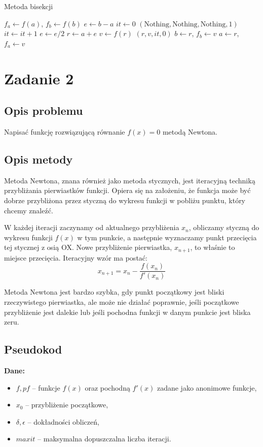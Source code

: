\documentclass{article}
\begin{document}
\begin{algorithm}[H]
\caption{Metoda bisekcji}
\begin{algorithmic}[1]
\STATE $f_a \gets f(a)$, $f_b \gets f(b)$
\STATE $e \gets b - a$
\STATE $it \gets 0$
    \RETURN $(\text{Nothing}, \text{Nothing}, \text{Nothing}, 1)$
\ENDIF
\WHILE{\TRUE}
    \STATE $it \gets it + 1$
    \STATE $e \gets e / 2$
    \STATE $r \gets a + e$
    \STATE $v \gets f(r)$
        \RETURN $(r, v, it, 0)$
    \ENDIF
        \STATE $b \gets r$, $f_b \gets v$
    \ELSE
        \STATE $a \gets r$, $f_a \gets v$
    \ENDIF
\ENDWHILE
\end{algorithmic}
\end{algorithm}

\section{Zadanie 2}
\subsection{Opis problemu}
Napisać funkcję rozwiązującą równanie \( f(x) = 0 \) metodą Newtona.

\subsection{Opis metody}
Metoda Newtona, znana również jako metoda stycznych, jest iteracyjną techniką przybliżania pierwiastków funkcji. Opiera się na założeniu, że funkcja może być dobrze przybliżona przez styczną do wykresu funkcji w pobliżu punktu, który chcemy znaleźć.

W każdej iteracji zaczynamy od aktualnego przybliżenia \( x_n \), obliczamy styczną do wykresu funkcji \( f(x) \) w tym punkcie, a następnie wyznaczamy punkt przecięcia tej stycznej z osią OX. Nowe przybliżenie pierwiastka, \( x_{n+1} \), to właśnie to miejsce przecięcia.
Iteracyjny wzór ma postać:
\[
x_{n+1} = x_n - \frac{f(x_n)}{f'(x_n)}
\]

Metoda Newtona jest bardzo szybka, gdy punkt początkowy jest bliski rzeczywistego pierwiastka, ale może nie działać poprawnie, jeśli początkowe przybliżenie jest dalekie lub jeśli pochodna funkcji w danym punkcie jest bliska zeru.

\subsection{Pseudokod}
\textbf{Dane:}
\begin{itemize}
  \item \( f, pf \) – funkcje \( f(x) \) oraz pochodną \( f'(x) \) zadane jako anonimowe funkcje,
  \item \( x_0 \) – przybliżenie początkowe,
  \item \( \delta, \epsilon \) – dokładności obliczeń,
  \item \( maxit \) – maksymalna dopuszczalna liczba iteracji.
\end{itemize}
\end{document}
